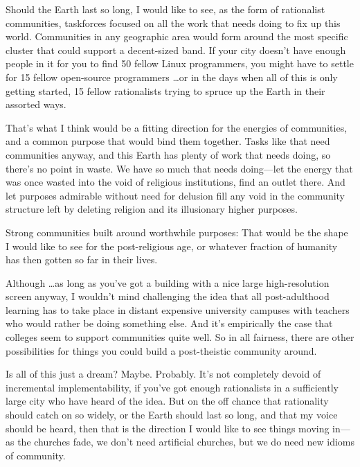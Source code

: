 {
 Should the Earth last so long, I would like to see, as the form of
rationalist communities, taskforces focused on all the work that needs
doing to fix up this world. Communities in any geographic area would
form around the most specific cluster that could support a decent-sized
band. If your city doesn't have enough people in it for
you to find 50 fellow Linux programmers, you might have to settle for
15 fellow open-source programmers \ldots or in the days when all of this
is only getting started, 15 fellow rationalists trying to spruce up the
Earth in their assorted ways.}

{
 That's what I think would be a fitting direction
for the energies of communities, and a common purpose that would bind
them together. Tasks like that need communities anyway, and this Earth
has plenty of work that needs doing, so there's no
point in waste. We have so much that needs doing---let the energy that
was once wasted into the void of religious institutions, find an outlet
there. And let purposes admirable without need for delusion fill any
void in the community structure left by deleting religion and its
illusionary higher purposes.}

{
 Strong communities built around worthwhile purposes: That would be
the shape I would like to see for the post-religious age, or whatever
fraction of humanity has then gotten so far in their lives.}

{
 Although \ldots as long as you've got a building
with a nice large high-resolution screen anyway, I
wouldn't mind challenging the idea that all
post-adulthood learning has to take place in distant expensive
university campuses with teachers who would rather be doing something
else. And it's empirically the case that colleges seem
to support communities quite well. So in all fairness, there are other
possibilities for things you could build a post-theistic community
around.}

{
 Is all of this just a dream? Maybe. Probably. It's
not completely devoid of incremental implementability, if
you've got enough rationalists in a sufficiently large
city who have heard of the idea. But on the off chance that rationality
should catch on so widely, or the Earth should last so long, and that
my voice should be heard, then that is the direction I would like to
see things moving in---as the churches fade, we don't
need artificial churches, but we do need new idioms of community.}

{\centering
 \ ~
\par}

